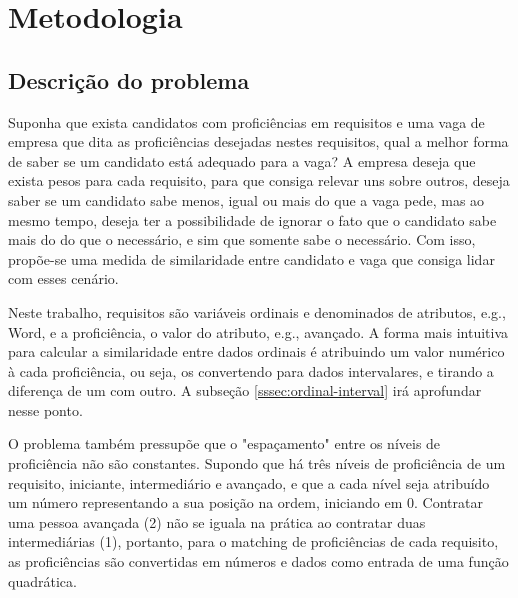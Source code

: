 \documentclass[preprint,12pt]{elsarticle}
\begin{document}
\section{Metodologia}
\label{sec:sample3}

\subsection{Descrição do problema}

Suponha que exista candidatos com proficiências em requisitos e uma vaga de empresa que dita as proficiências desejadas nestes requisitos, qual a melhor forma de saber se um candidato está adequado para a vaga? A empresa deseja que exista pesos para cada requisito, para que consiga relevar uns sobre outros, deseja saber se um candidato sabe menos, igual ou mais do que a vaga pede, mas ao mesmo tempo, deseja ter a possibilidade de ignorar o fato que o candidato sabe mais do do que o necessário, e sim que somente sabe o necessário. Com isso, propõe-se uma medida de similaridade entre candidato e vaga que consiga lidar com esses cenário.

Neste trabalho, requisitos são variáveis ordinais e denominados de atributos, e.g., Word, e a proficiência, o valor do atributo, e.g., avançado. A forma mais intuitiva para calcular a similaridade entre dados ordinais é atribuindo um valor numérico à cada proficiência, ou seja, os convertendo para dados intervalares, e tirando a diferença de um com outro. A subseção \ref{sssec:ordinal-interval} irá aprofundar nesse ponto.

O problema também pressupõe que o "espaçamento" entre os níveis de proficiência não são constantes. Supondo que há três níveis de proficiência de um requisito, iniciante, intermediário e avançado, e que a cada nível seja atribuído um número representando a sua posição na ordem, iniciando em 0. Contratar uma pessoa avançada (2) não se iguala na prática ao contratar duas intermediárias (1), portanto, para o matching de proficiências de cada requisito, as proficiências são convertidas em números e dados como entrada de uma função quadrática. 
\end{document}
